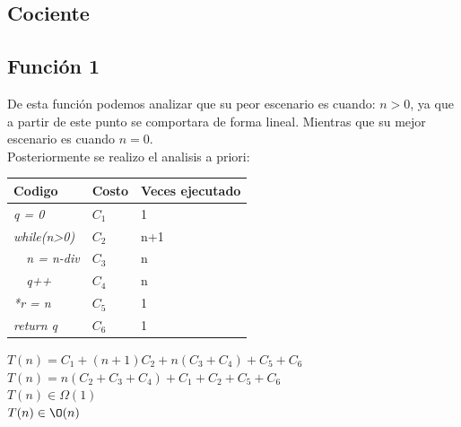 \documentclass[spanish]{article}
\begin{document}
			\subsection*{Cociente}
				\subsection*{Función 1}
					De esta función podemos analizar que su peor escenario es cuando: $n>0$, ya que a partir de este punto se comportara de forma lineal. Mientras que su mejor escenario es cuando $n=0$.\\
					Posteriormente se realizo el analisis a priori:\\
					\begin{center}
						\begin{table}[H]
							\begin{tabular}{|l|l|l|}
								\hline
								\rowcolor[HTML]{FFCC67} 
								Codigo                           & Costo & Veces ejecutado \\ \hline
								\textit{q = 0}                    & $C_1$    & 1               \\ \hline
								\textit{while(n\textgreater{}0)} & $C_2$    & n+1             \\ \hline
								\textit{\  \  n = n-div}                 & $C_3$    & n               \\ \hline
								\textit{\  \  q++}                     & $C_4$    & n               \\ \hline
								\textit{*r = n}                & $C_5$    & 1               \\ \hline
								\textit{return q}                & $C_6$    & 1               \\ \hline
							\end{tabular}
						\end{table}						
						$T(n) = C_1+(n+1)C_2+n(C_3+C_4)+C_5+C_6$\\							
						$T(n) = n(C_2+C_3+C_4)+C_1+C_2+C_5+C_6$\\							
						$T(n) \in \Omega(1)$\\							
						$T(n) \in \O(n)$\\
					\end{center}
\end{document}
